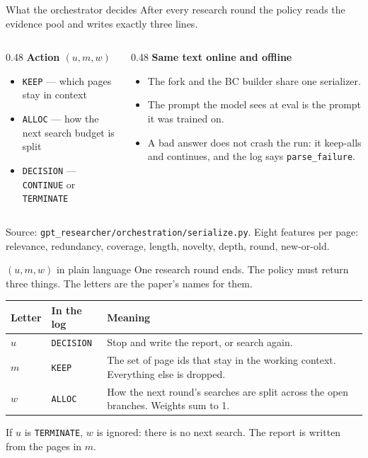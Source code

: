 \documentclass[aspectratio=169,11pt]{beamer}
\begin{document}
\begin{frame}{What the orchestrator decides}
  After every research round the policy reads the evidence pool and writes
  exactly three lines.
  \vspace{0.4em}
  \begin{columns}[T]
    \begin{column}{0.48\textwidth}
      \textbf{Action $(u, m, w)$}
      \begin{itemize}
        \item \texttt{KEEP} --- which pages stay in context
        \item \texttt{ALLOC} --- how the next search budget is split
        \item \texttt{DECISION} --- \texttt{CONTINUE} or \texttt{TERMINATE}
      \end{itemize}
    \end{column}
    \begin{column}{0.48\textwidth}
      \textbf{Same text online and offline}
      \begin{itemize}
        \item The fork and the BC builder share one serializer.
        \item The prompt the model sees at eval is the prompt it was trained on.
        \item A bad answer does not crash the run: it keep-alls and continues, and the log says \texttt{parse\_failure}.
      \end{itemize}
    \end{column}
  \end{columns}
  \vspace{0.6em}
  {\small Source: \texttt{gpt\_researcher/orchestration/serialize.py}. Eight features per page: relevance, redundancy, coverage, length, novelty, depth, round, new-or-old.}
\end{frame}

\begin{frame}{$(u, m, w)$ in plain language}
  One research round ends. The policy must return three things. The letters are the paper's names for them.
  \vspace{0.4em}
  \begin{tabular}{llp{7.2cm}}
    \hline
    Letter & In the log & Meaning \\
    \hline
    $u$ & \texttt{DECISION} & Stop and write the report, or search again. \\
    $m$ & \texttt{KEEP} & The set of page ids that stay in the working context. Everything else is dropped. \\
    $w$ & \texttt{ALLOC} & How the next round's searches are split across the open branches. Weights sum to 1. \\
    \hline
  \end{tabular}
  \vspace{0.5em}
  If $u$ is \texttt{TERMINATE}, $w$ is ignored: there is no next search. The report is written from the pages in $m$.
\end{frame}
\end{document}
